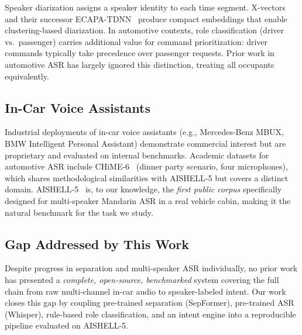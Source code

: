 Speaker diarization assigns a speaker identity to each time segment.
X-vectors~\cite{snyder2018x} and their successor ECAPA-TDNN~\cite{desplanques2020ecapa}
produce compact embeddings that enable clustering-based diarization.
In automotive contexts, role classification (driver vs.\ passenger) carries
additional value for command prioritization: driver commands typically take
precedence over passenger requests. Prior work in automotive ASR has largely
ignored this distinction, treating all occupants equivalently.

\subsection{In-Car Voice Assistants}

Industrial deployments of in-car voice assistants (e.g., Mercedes-Benz
MBUX, BMW Intelligent Personal Assistant) demonstrate commercial interest but
are proprietary and evaluated on internal benchmarks. Academic datasets for
automotive ASR include CHiME-6~\cite{watanabe2020chime6} (dinner party
scenario, four microphones), which shares methodological similarities with
AISHELL-5 but covers a distinct domain. AISHELL-5~\cite{aishell5_2025} is,
to our knowledge, the \emph{first public corpus} specifically designed for
multi-speaker Mandarin ASR in a real vehicle cabin, making it the natural
benchmark for the task we study.

\subsection{Gap Addressed by This Work}

Despite progress in separation and multi-speaker ASR individually,
no prior work has presented a \emph{complete, open-source, benchmarked} system
covering the full chain from raw multi-channel in-car audio to speaker-labeled
intent. Our work closes this gap by coupling pre-trained separation
(SepFormer), pre-trained ASR (Whisper), rule-based role classification, and an
intent engine into a reproducible pipeline evaluated on AISHELL-5.
